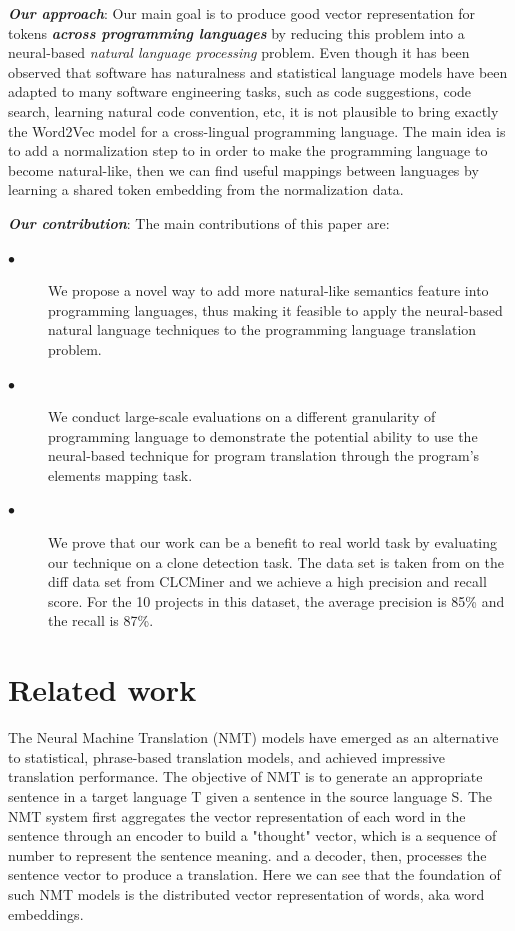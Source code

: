 \textbf{\textit{Our approach}}: Our main goal is to produce good vector representation for tokens \textbf{\textit{across programming languages}} by reducing this problem into a neural-based \textit{natural language processing} problem. Even though it has been observed that software has naturalness \cite{hindle2012naturalness} and statistical language models have been adapted to many software engineering tasks, such as code suggestions, code search, learning natural code convention, etc, it is not plausible to bring exactly the Word2Vec model for a cross-lingual programming language.  The main idea is to add a normalization step to in order to make the programming language to become natural-like, then we can find useful mappings between languages by learning a shared token embedding from the normalization data.

\textbf{\textit{Our contribution}}: The main contributions of this paper are:
\begin{description}
	\item [$\bullet$] We propose a novel way to add more natural-like semantics feature into programming languages, thus making it feasible to apply the neural-based natural language techniques to the programming language translation problem.
	\item [$\bullet$] We conduct large-scale evaluations on a different granularity of programming language to demonstrate the potential ability to use the neural-based technique for program translation through the program's elements mapping task.
	\item [$\bullet$] We prove that our work can be a benefit to real world task by evaluating our technique on a clone detection task. The data set is taken from on the diff data set from CLCMiner \cite{cheng2017clcminer} and we achieve a high precision and recall score. For the 10 projects in this dataset, the average precision is 85\% and the recall is 87\%.
\end{description}

\section{Related work}
The Neural Machine Translation (NMT) models have emerged as an alternative to statistical, phrase-based translation models, and achieved impressive translation performance. The objective of NMT is to generate an appropriate sentence in a target language T given a sentence in the source language S. The NMT system first aggregates the vector representation of each word in the sentence through an encoder to build a "thought" vector, which is a sequence of number to represent the sentence meaning. and a decoder, then, processes the sentence vector to produce a translation. Here we can see that the foundation of such NMT models is the distributed vector representation of words, aka word embeddings.

